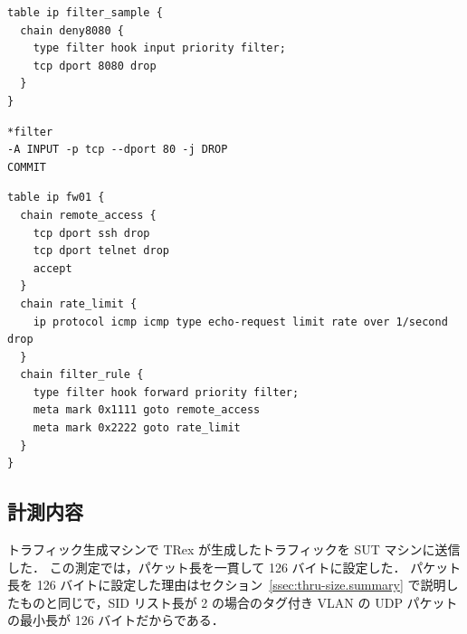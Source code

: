 \begin{lstlisting}[caption=Definition of simple filter rule for nftables,label=nft-filter-rule]
table ip filter_sample {
  chain deny8080 {
    type filter hook input priority filter;
    tcp dport 8080 drop
  }
}
\end{lstlisting}

\begin{lstlisting}[caption=Definition of simple filter rule for iptables,label=ipt-filter-rule]
*filter
-A INPUT -p tcp --dport 80 -j DROP
COMMIT
\end{lstlisting}

\begin{lstlisting}[caption=An example of a definition: regular chain and base chain,label=nft-chain]
table ip fw01 {
  chain remote_access {
    tcp dport ssh drop
    tcp dport telnet drop
    accept
  }
  chain rate_limit {
    ip protocol icmp icmp type echo-request limit rate over 1/second drop
  }
  chain filter_rule {
    type filter hook forward priority filter;
    meta mark 0x1111 goto remote_access
    meta mark 0x2222 goto rate_limit
  }
}
\end{lstlisting}

\subsection{計測内容}
\label{ssec:thru-chains.summary}
トラフィック生成マシンで TRex が生成したトラフィックを SUT マシンに送信した．
この測定では，パケット長を一貫して 126 バイトに設定した．
パケット長を 126 バイトに設定した理由はセクション~\ref{ssec:thru-size.summary} で説明したものと同じで，SID リスト長が 2 の場合のタグ付き VLAN の UDP パケットの最小長が 126 バイトだからである．


